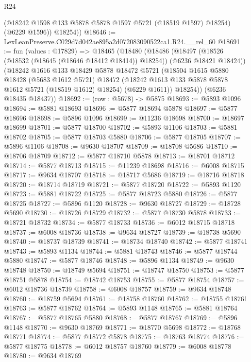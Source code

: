 \begin{lexlean}{R24}
\begin{coremodule}
          (@18242 @1598 @133 @5878 @5878 @1597 @5721 (@18519 @1597) @18254)
          (@6229 @1596))
        @18254))
@18646 := LexLeanPreserve.C029d7d042ae895a2d072083090522ca1.R24.__rel_60
@18691 := fun (values : @17829) =>
  @18465
    (@18480
      (@18486
        (@18497 (@18526 (@18532 (@18645 (@18646 @18412 @18414)) @18254)) (@6236 @18421 @18424))
        (@18242
          @1616
          @133
          @18429
          @5878
          @18472
          @5721
          (@18504
            @1615
            @5880
            @18428
            (@5683 @1612 @5721)
            @18472
            (@18242 @1613 @133 @5878 @5878 @1612 @5721 (@18519 @1612) @18254)
            (@6229 @1611))
          @18254))
      (@6236 @18435 @18437))
@18692 := (row : @5678) -> @5875
@18693 := @5893 @1096
@18694 := @5881 @18693
@18696 := @5877 @18694 @5878
@18697 := @5877 @18696
@18698 := @5896 @1096
@18699 := @11236 @18698
@18700 := @18697 @18699
@18701 := @5877 @18700
@18702 := @5893 @1106
@18703 := @5881 @18702
@18705 := @5877 @18703 @5880
@18706 := @5877 @18705
@18707 := @5896 @1106
@18708 := @9630 @18707
@18709 := @18708 @5686
@18710 := @18706 @18709
@18712 := @5877 @18710 @5878
@18713 := @18701 @18712
@18714 := @5877 @18713
@18715 := @11239 @18698
@18716 := @6008 @18715
@18717 := @9634 @18707
@18718 := @18717 @5686
@18719 := @18716 @18718
@18720 := @18714 @18719
@18721 := @5877 @18720
@18722 := @5893 @1120
@18723 := @5881 @18722
@18725 := @5877 @18723 @5880
@18726 := @5877 @18725
@18727 := @5896 @1120
@18728 := @9630 @18727
@18729 := @18728 @5690
@18730 := @18726 @18729
@18732 := @5877 @18730 @5878
@18733 := @18721 @18732
@18734 := @5877 @18733
@18736 := @6012 @18715 @18718
@18737 := @6008 @18736
@18738 := @9634 @18727
@18739 := @18738 @5690
@18740 := @18737 @18739
@18741 := @18734 @18740
@18742 := @5877 @18741
@18743 := @5893 @1134
@18744 := @5881 @18743
@18746 := @5877 @18744 @5880
@18747 := @5877 @18746
@18748 := @5896 @1134
@18749 := @9630 @18748
@18750 := @18749 @5694
@18751 := @18747 @18750
@18753 := @5877 @18751 @5878
@18754 := @18742 @18753
@18755 := @5877 @18754
@18757 := @6012 @18736 @18739
@18758 := @6008 @18757
@18759 := @9634 @18748
@18760 := @18759 @5694
@18761 := @18758 @18760
@18762 := @18755 @18761
@18763 := @5877 @18762
@18764 := @5893 @1148
@18765 := @5881 @18764
@18767 := @5877 @18765 @5880
@18768 := @5877 @18767
@18769 := @5896 @1148
@18770 := @9630 @18769
@18771 := @18770 @5698
@18772 := @18768 @18771
@18774 := @5877 @18772 @5878
@18775 := @18763 @18774
@18776 := @5877 @18775
@18778 := @6012 @18757 @18760
@18779 := @6008 @18778
@18780 := @9634 @18769

\end{coremodule}
\end{lexlean}
